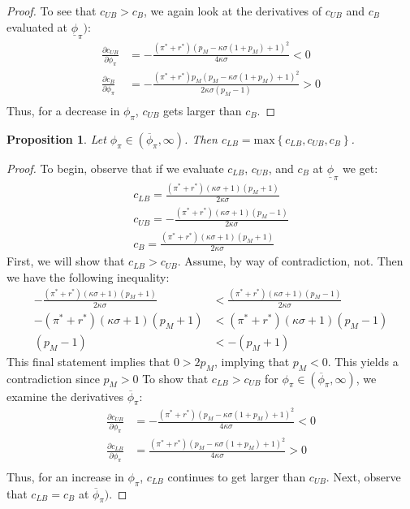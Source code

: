 \documentclass[11pt]{article}
\newtheorem{proposition}{Proposition}
\begin{document}
\begin{singlespace}
\begin{proof}
			To see that $c_{UB} > c_{B}$, we again look at the derivatives of $c_{UB}$ and $c_{B}$ evaluated at $\underline{\phi}_{\pi})$:
			\begin{align*}
			\frac{\partial c_{UB}}{\partial \phi_{\pi}} &= -\frac{(\pi^* + r^*)(p_M-\kappa\sigma(1+p_M)+1)^2}{4\kappa\sigma} < 0\\
			\frac{\partial c_{B}}{\partial \phi_{\pi}} &= -\frac{(\pi^* + r^*)p_M(p_M-\kappa\sigma(1+p_M)+1)^2}{2\kappa\sigma(p_M -1)} > 0\\
			\end{align*}
			Thus, for a decrease in  $\phi_{\pi}$, $c_{UB}$ gets larger than $c_{B}$. 
		\end{proof}
		\begin{proposition}\label{prop:cPHIpilb}
			Let $\phi_{\pi}\in(\overline{\phi}_{\pi},\infty)$. Then $c_{LB} = \text{max}\left\{c_{LB}, c_{UB}, c_{B}\right\}$. 
		\end{proposition}
		\begin{proof}
			To begin, observe that if we evaluate $c_{LB}$, $c_{UB}$, and $c_{B}$ at $\underline{\phi}_{\pi}$ we get:
			\begin{align*}
			c_{LB} =\frac{(\pi^* + r^*)(\kappa\sigma + 1)(p_M +1)}{2\kappa\sigma}\\
			c_{UB} =-\frac{(\pi^* + r^*)(\kappa\sigma + 1)(p_M -1)}{2\kappa\sigma}\\
			c_{B} = \frac{(\pi^* + r^*)(\kappa\sigma + 1)(p_M +1)}{2\kappa\sigma}
			\end{align*}
			First, we will show that $c_{LB} > c_{UB}$. 
			Assume, by way of contradiction, not.  Then we have the following inequality: 
			\begin{align*}
			-\frac{(\pi^* + r^*)(\kappa\sigma + 1)(p_M +1)}{2\kappa\sigma} &< \frac{(\pi^* + r^*)(\kappa\sigma + 1)(p_M -1)}{2\kappa\sigma}\\
			-(\pi^* + r^*)(\kappa\sigma + 1)(p_M +1) &< (\pi^* + r^*)(\kappa\sigma + 1)(p_M -1)\\
			(p_M -1) &< -(p_M +1)
			\end{align*}
			This final statement implies that $0>2p_M$, implying that $p_M<0$. This yields a contradiction since $p_M>0$ To show that  $c_{LB} > c_{UB}$ for $\phi_{\pi}\in(\overline{\phi}_{\pi},\infty)$, we examine the derivatives $\overline{\phi}_{\pi}$: 
			\begin{align*}
			\frac{\partial c_{UB}}{\partial \phi_{\pi}} &= -\frac{(\pi^* + r^*)(p_M-\kappa\sigma(1+p_M)+1)^2}{4\kappa\sigma} < 0\\
			\frac{\partial c_{LB}}{\partial \phi_{\pi}} &= \frac{(\pi^* + r^*)(p_M-\kappa\sigma(1+p_M)+1)^2}{4\kappa\sigma} > 0\\
			\end{align*}
			Thus, for an increase in  $\phi_{\pi}$, $c_{LB}$ continues to get larger than $c_{UB}$. 
			Next, observe that $c_{LB} = c_{B}$ at $\overline{\phi}_{\pi})$. 
			

\end{proof}
\end{singlespace}
\end{document}
